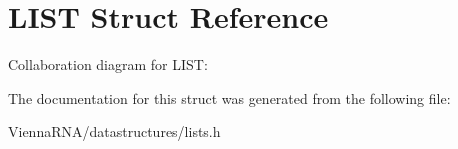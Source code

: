 \hypertarget{structLIST}{}\section{L\+I\+ST Struct Reference}
\label{structLIST}


Collaboration diagram for L\+I\+ST\+:


The documentation for this struct was generated from the following file\+:\begin{DoxyCompactItemize}
\item 
Vienna\+R\+N\+A/datastructures/lists.\+h\end{DoxyCompactItemize}

